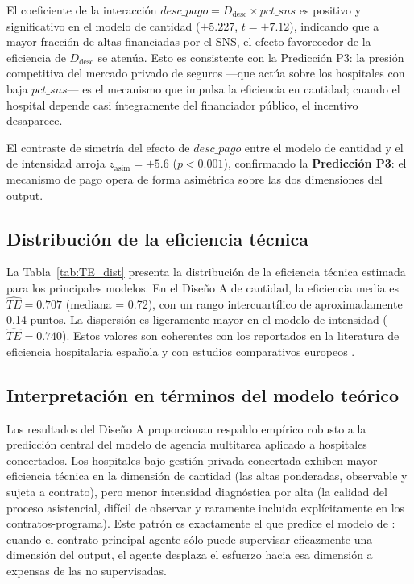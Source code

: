 El coeficiente de la interacción \(\textit{desc\_pago} = D_{\text{desc}} \times \textit{pct\_sns}\) es positivo y significativo en el modelo de cantidad ($+5.227$, $t = +7.12$), indicando que a mayor fracción de altas financiadas por el SNS, el efecto favorecedor de la eficiencia de \(D_{\text{desc}}\) se atenúa. Esto es consistente con la Predicción P3: la presión competitiva del mercado privado de seguros —que actúa sobre los hospitales con baja \(\textit{pct\_sns}\)— es el mecanismo que impulsa la eficiencia en cantidad; cuando el hospital depende casi íntegramente del financiador público, el incentivo desaparece.

El contraste de simetría del efecto de \(\textit{desc\_pago}\) entre el modelo de cantidad y el de intensidad arroja $z_{\text{asim}} = +5.6$ ($p < 0.001$), confirmando la \textbf{Predicción P3}: el mecanismo de pago opera de forma asimétrica sobre las dos dimensiones del output.

\subsection{Distribución de la eficiencia técnica}
\label{subsec:TE_dist_A}

La Tabla~\ref{tab:TE_dist} presenta la distribución de la eficiencia técnica estimada para los principales modelos. En el Diseño A de cantidad, la eficiencia media es $\widehat{TE} = 0.707$ (mediana = 0.72), con un rango intercuartílico de aproximadamente 0.14 puntos. La dispersión es ligeramente mayor en el modelo de intensidad ($\widehat{TE} = 0.740$). Estos valores son coherentes con los reportados en la literatura de eficiencia hospitalaria española \citep{puigjunoy2000} y con estudios comparativos europeos \citep{mchale2013}.

\begin{table}[htbp]
\centering
\caption{Distribución de la eficiencia técnica estimada}
\label{tab:TE_dist}
\small

\end{table}

\subsection{Interpretación en términos del modelo teórico}
\label{subsec:interpretacion_A}

Los resultados del Diseño A proporcionan respaldo empírico robusto a la predicción central del modelo de agencia multitarea aplicado a hospitales concertados. Los hospitales bajo gestión privada concertada exhiben mayor eficiencia técnica en la dimensión de cantidad (las altas ponderadas, observable y sujeta a contrato), pero menor intensidad diagnóstica por alta (la calidad del proceso asistencial, difícil de observar y raramente incluida explícitamente en los contratos-programa). Este patrón es exactamente el que predice el modelo de \citet{holmstrom1991multitask}: cuando el contrato principal-agente sólo puede supervisar eficazmente una dimensión del output, el agente desplaza el esfuerzo hacia esa dimensión a expensas de las no supervisadas.

